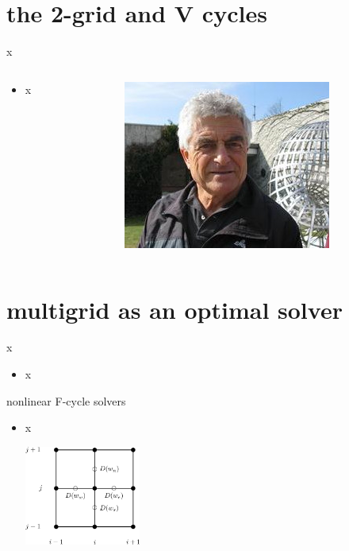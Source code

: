 \documentclass[10pt,
               svgnames,
               hyperref={colorlinks,citecolor=DeepPink4,linkcolor=FireBrick,urlcolor=Maroon},
               usepdftitle=false]{beamer}
\begin{document}
\section{the 2-grid and V cycles}

\begin{frame}{x}
\begin{columns}
\begin{column}{0.8\textwidth}
\begin{itemize}
\item x
\end{itemize}
\end{column}
\begin{column}{0.17\textwidth}
\hfill \includegraphics[width=\textwidth]{images/abrandt.jpg}
\end{column}
\end{columns}
\end{frame}



\section{multigrid as an optimal solver}

\begin{frame}{x}
\begin{itemize}
\item x
\end{itemize}
\end{frame}

\begin{frame}{nonlinear F-cycle solvers}
\begin{itemize}
\item x

\hfill \includegraphics[width=0.3\textwidth]{images/msboxstencil.png}
\end{itemize}
\end{frame}
\end{document}
